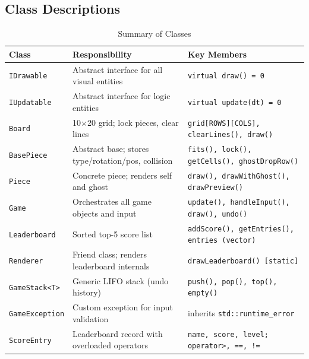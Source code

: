 \documentclass[11pt]{article}
\begin{document}
\subsection{Class Descriptions}

\begin{table}[H]
    \centering
    \caption{Summary of Classes}
    \label{tab:classes}
    \renewcommand{\arraystretch}{1.3}
    \begin{tabular}{|l|p{3.8cm}|p{5cm}|}
        \hline
        \textbf{Class} & \textbf{Responsibility} & \textbf{Key Members} \\
        \hline
        \texttt{IDrawable}    & Abstract interface for all visual entities & \texttt{virtual draw() = 0} \\
        \hline
        \texttt{IUpdatable}   & Abstract interface for logic entities & \texttt{virtual update(dt) = 0} \\
        \hline
        \texttt{Board}        & 10$\times$20 grid; lock pieces, clear lines & \texttt{grid[ROWS][COLS], clearLines(), draw()} \\
        \hline
        \texttt{BasePiece}    & Abstract base; stores type/rotation/pos, collision & \texttt{fits(), lock(), getCells(), ghostDropRow()} \\
        \hline
        \texttt{Piece}        & Concrete piece; renders self and ghost & \texttt{draw(), drawWithGhost(), drawPreview()} \\
        \hline
        \texttt{Game}         & Orchestrates all game objects and input & \texttt{update(), handleInput(), draw(), undo()} \\
        \hline
        \texttt{Leaderboard}  & Sorted top-5 score list & \texttt{addScore(), getEntries(), entries (vector)} \\
        \hline
        \texttt{Renderer}     & Friend class; renders leaderboard internals & \texttt{drawLeaderboard() [static]} \\
        \hline
        \texttt{GameStack<T>} & Generic LIFO stack (undo history) & \texttt{push(), pop(), top(), empty()} \\
        \hline
        \texttt{GameException}& Custom exception for input validation & inherits \texttt{std::runtime\_error} \\
        \hline
        \texttt{ScoreEntry}   & Leaderboard record with overloaded operators & \texttt{name, score, level; operator>, ==, !=} \\
        \hline
    \end{tabular}
\end{table}
\end{document}
